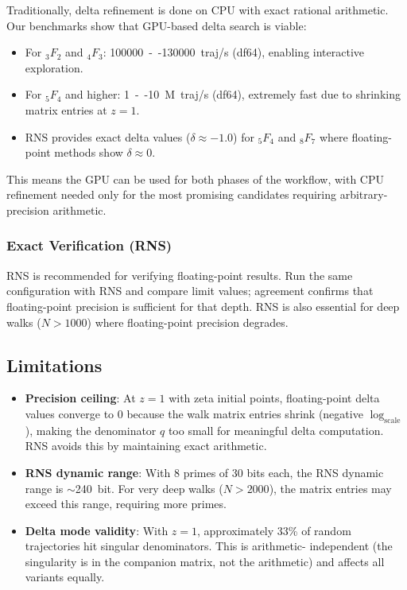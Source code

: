 \documentclass[11pt,a4paper]{article}
\begin{document}
Traditionally, delta refinement is done on CPU with exact rational
arithmetic. Our benchmarks show that GPU-based delta search is viable:
\begin{itemize}[leftmargin=1.5cm]
    \item For ${}_3F_2$ and ${}_4F_3$: \SI{100000}{--}\SI{130000}{traj/s}
    (df64), enabling interactive exploration.
    \item For ${}_5F_4$ and higher: \SI{1}{--}\SI{10}{M traj/s} (df64),
    extremely fast due to shrinking matrix entries at $z=1$.
    \item RNS provides exact delta values ($\delta \approx -1.0$) for
    ${}_5F_4$ and ${}_8F_7$ where floating-point methods show $\delta \approx 0$.
\end{itemize}
This means the GPU can be used for both phases of the workflow, with CPU
refinement needed only for the most promising candidates requiring
arbitrary-precision arithmetic.

\subsubsection{Exact Verification (RNS)}

RNS is recommended for verifying floating-point results. Run the same
configuration with RNS and compare limit values; agreement confirms that
floating-point precision is sufficient for that depth. RNS is also
essential for deep walks ($N > 1000$) where floating-point precision
degrades.

\subsection{Limitations}

\begin{itemize}[leftmargin=1.5cm]
    \item \textbf{Precision ceiling}: At $z=1$ with zeta initial points,
    floating-point delta values converge to 0 because the walk matrix
    entries shrink (negative $\log_{\text{scale}}$), making the denominator
    $q$ too small for meaningful delta computation. RNS avoids this by
    maintaining exact arithmetic.

    \item \textbf{RNS dynamic range}: With 8 primes of 30 bits each, the
    RNS dynamic range is $\sim$\SI{240}{bit}. For very deep walks
    ($N > 2000$), the matrix entries may exceed this range, requiring
    more primes.

    \item \textbf{Delta mode validity}: With $z=1$, approximately 33\% of
    random trajectories hit singular denominators. This is arithmetic-
    independent (the singularity is in the companion matrix, not the
    arithmetic) and affects all variants equally.
\end{itemize}
\end{document}
